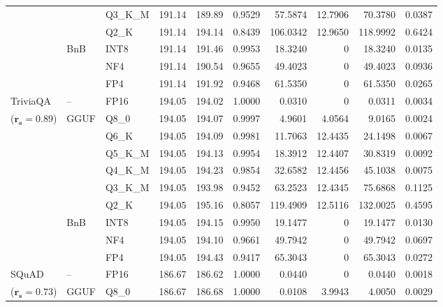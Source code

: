 \begin{longtable}{ll l rrrrrrr}
 &  & Q3\_K\_M & 191.14 & 189.89 & 0.9529 & 57.5874 & 12.7906 & 70.3780 & 0.0387 \\
 &  & Q2\_K & 191.14 & 194.14 & \cellcolor{red!18} 0.8439 & \cellcolor{red!18} 106.0342 & 12.9650 & \cellcolor{red!18} 118.9992 & \cellcolor{red!18} 0.6424 \\
 & BnB & INT8 & 191.14 & 191.46 & 0.9953 & 18.3240 & \cellcolor{cyan!12} $0$ & 18.3240 & 0.0135 \\
 &  & NF4 & 191.14 & 190.54 & 0.9655 & 49.4023 & \cellcolor{cyan!12} $0$ & 49.4023 & 0.0936 \\
 &  & FP4 & 191.14 & 191.92 & \cellcolor{red!18} 0.9468 & \cellcolor{red!18} 61.5350 & \cellcolor{cyan!12} $0$ & \cellcolor{red!18} 61.5350 & \cellcolor{red!18} 0.0265 \\
\midrule
TriviaQA & -- & FP16 & 194.05 & 194.02 & 1.0000 & 0.0310 & \cellcolor{cyan!12} $0$ & 0.0311 & 0.0034 \\
{\small ($\mathbf{r_s{=}0.89}$)} & GGUF & Q8\_0 & 194.05 & 194.07 & 0.9997 & 4.9601 & 4.0564 & 9.0165 & 0.0024 \\
 &  & Q6\_K & 194.05 & 194.09 & 0.9981 & 11.7063 & 12.4435 & 24.1498 & 0.0067 \\
 &  & Q5\_K\_M & 194.05 & 194.13 & 0.9954 & 18.3912 & 12.4407 & 30.8319 & 0.0092 \\
 &  & Q4\_K\_M & 194.05 & 194.23 & 0.9854 & 32.6582 & 12.4456 & 45.1038 & 0.0075 \\
 &  & Q3\_K\_M & 194.05 & 193.98 & \cellcolor{red!18} 0.9452 & \cellcolor{red!18} 63.2523 & 12.4345 & \cellcolor{red!18} 75.6868 & \cellcolor{red!18} 0.1125 \\
 &  & Q2\_K & 194.05 & 195.16 & \cellcolor{red!18} 0.8057 & \cellcolor{red!18} 119.4909 & 12.5116 & \cellcolor{red!18} 132.0025 & \cellcolor{red!18} 0.4595 \\
 & BnB & INT8 & 194.05 & 194.15 & 0.9950 & 19.1477 & \cellcolor{cyan!12} $0$ & 19.1477 & 0.0130 \\
 &  & NF4 & 194.05 & 194.10 & 0.9661 & 49.7942 & \cellcolor{cyan!12} $0$ & 49.7942 & 0.0697 \\
 &  & FP4 & 194.05 & 194.43 & \cellcolor{red!18} 0.9417 & \cellcolor{red!18} 65.3043 & \cellcolor{cyan!12} $0$ & \cellcolor{red!18} 65.3043 & \cellcolor{red!18} 0.0272 \\
\midrule
SQuAD & -- & FP16 & 186.67 & 186.62 & 1.0000 & 0.0440 & \cellcolor{cyan!12} $0$ & 0.0440 & 0.0018 \\
{\small ($\mathbf{r_s{=}0.73}$)} & GGUF & Q8\_0 & 186.67 & 186.68 & 1.0000 & 0.0108 & 3.9943 & 4.0050 & 0.0029 \\

\end{longtable}

